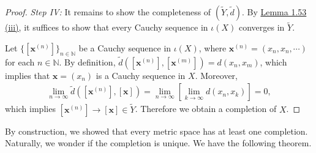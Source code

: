 \documentclass{article}
\begin{document}
\begin{proof}
	\vspace{0.1cm}
	\textit{Step IV:} It remains to show the completeness of $(\widetilde{Y},\tilde{d})$. By \hyperref[lemma:1.53]{Lemma 1.53 (iii)}, it suffices to show that every Cauchy sequence in $\iota(X)$ converges in $\widetilde{Y}$.
	
	Let $\{[\mathbf{x}^{(n)}]\}_{n\in\mathbb{N}}$ be a Cauchy sequence in $\iota(X)$, where $\mathbf{x}^{(n)}=(x_n,x_n,\cdots)$ for each $n\in\mathbb{N}$. By definition, $\tilde{d}([\mathbf{x}^{(n)}],[\mathbf{x}^{(m)}]) = d(x_n,x_m)$, which implies that $\mathbf{x}=(x_n)$ is a Cauchy sequence in $X$. Moreover,
	\begin{align*}
		\lim_{n\to\infty}\tilde{d}\left([\mathbf{x}^{(n)}],[\mathbf{x}]\right) = \lim_{n\to\infty}\left[\lim_{k\to\infty} d(x_n,x_k)\right] = 0,
	\end{align*}
	which implies $[\mathbf{x}^{(n)}]\to[\mathbf{x}]\in\widetilde{Y}$. Therefore we obtain a completion of $X$.
\end{proof}

By construction, we showed that every metric space has at least one completion. Naturally, we wonder if the completion is unique. We have the following theorem.
\end{document}

